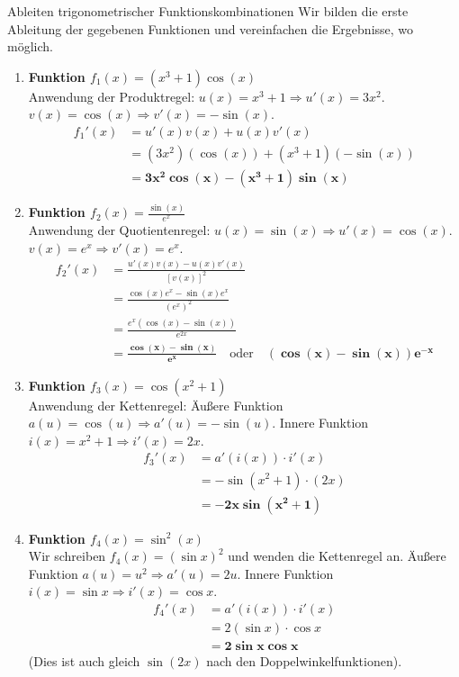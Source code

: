 \begin{loesungsumgebung}{Ableiten trigonometrischer Funktionskombinationen}
Wir bilden die erste Ableitung der gegebenen Funktionen und vereinfachen die Ergebnisse, wo möglich.

\begin{enumerate}[label=(\alph*)]
    \item \textbf{Funktion $f_1(x) = (x^3+1)\cos(x)$} \\
    Anwendung der Produktregel: $u(x) = x^3+1 \Rightarrow u'(x) = 3x^2$. $v(x) = \cos(x) \Rightarrow v'(x) = -\sin(x)$.
    \begin{align*}
    f_1'(x) &= u'(x)v(x) + u(x)v'(x) \\
            &= (3x^2)(\cos(x)) + (x^3+1)(-\sin(x)) \\
            &= \mathbf{3x^2\cos(x) - (x^3+1)\sin(x)}
    \end{align*}

    \item \textbf{Funktion $f_2(x) = \frac{\sin(x)}{e^x}$} \\
    Anwendung der Quotientenregel: $u(x) = \sin(x) \Rightarrow u'(x) = \cos(x)$. $v(x) = e^x \Rightarrow v'(x) = e^x$.
    \begin{align*}
    f_2'(x) &= \frac{u'(x)v(x) - u(x)v'(x)}{[v(x)]^2} \\
            &= \frac{\cos(x)e^x - \sin(x)e^x}{(e^x)^2} \\
            &= \frac{e^x(\cos(x) - \sin(x))}{e^{2x}} \\
            &= \mathbf{\frac{\cos(x) - \sin(x)}{e^x}} \quad \text{oder} \quad \mathbf{(\cos(x) - \sin(x))e^{-x}}
    \end{align*}

    \item \textbf{Funktion $f_3(x) = \cos(x^2+1)$} \\
    Anwendung der Kettenregel: Äußere Funktion $a(u) = \cos(u) \Rightarrow a'(u) = -\sin(u)$. Innere Funktion $i(x) = x^2+1 \Rightarrow i'(x) = 2x$.
    \begin{align*}
    f_3'(x) &= a'(i(x)) \cdot i'(x) \\
            &= -\sin(x^2+1) \cdot (2x) \\
            &= \mathbf{-2x\sin(x^2+1)}
    \end{align*}

    \item \textbf{Funktion $f_4(x) = \sin^2(x)$} \\
    Wir schreiben $f_4(x) = (\sin x)^2$ und wenden die Kettenregel an.
    Äußere Funktion $a(u) = u^2 \Rightarrow a'(u) = 2u$. Innere Funktion $i(x) = \sin x \Rightarrow i'(x) = \cos x$.
    \begin{align*}
    f_4'(x) &= a'(i(x)) \cdot i'(x) \\
            &= 2(\sin x) \cdot \cos x \\
            &= \mathbf{2\sin x \cos x}
    \end{align*}
    (Dies ist auch gleich $\sin(2x)$ nach den Doppelwinkelfunktionen).


\end{enumerate}
\end{loesungsumgebung}
